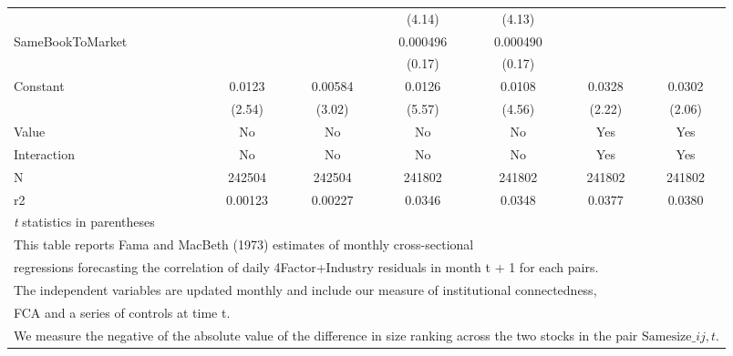 {\begin{tabular}{l*{6}{c}}
                    &                     &                     &      (4.14)         &      (4.13)         &                     &                     \\
[1em]
SameBookToMarket    &                     &                     &    0.000496         &    0.000490         &                     &                     \\
                    &                     &                     &      (0.17)         &      (0.17)         &                     &                     \\
[1em]
Constant            &      0.0123\sym{*}  &     0.00584\sym{**} &      0.0126\sym{***}&      0.0108\sym{***}&      0.0328\sym{*}  &      0.0302\sym{*}  \\
                    &      (2.54)         &      (3.02)         &      (5.57)         &      (4.56)         &      (2.22)         &      (2.06)         \\
\hline
Value               &          No         &          No         &          No         &          No         &         Yes         &         Yes         \\
Interaction         &          No         &          No         &          No         &          No         &         Yes         &         Yes         \\
N                   &      242504         &      242504         &      241802         &      241802         &      241802         &      241802         \\
r2                  &     0.00123         &     0.00227         &      0.0346         &      0.0348         &      0.0377         &      0.0380         \\
\hline\hline
\multicolumn{7}{l}{\footnotesize \textit{t} statistics in parentheses}\\
\multicolumn{7}{l}{\footnotesize This table reports Fama and MacBeth (1973) estimates of monthly cross-sectional}\\
\multicolumn{7}{l}{\footnotesize  regressions forecasting the correlation of daily 4Factor+Industry residuals in month t + 1 for each pairs.}\\
\multicolumn{7}{l}{\footnotesize The independent variables are updated monthly and include our measure of institutional connectedness,}\\
\multicolumn{7}{l}{\footnotesize  FCA and a series of controls at time t.}\\
\multicolumn{7}{l}{\footnotesize We measure the negative of the absolute value of the difference in size ranking across the two stocks in the pair $ \text{Samesize}\_{ij,t} $.}\\

\end{tabular}}
